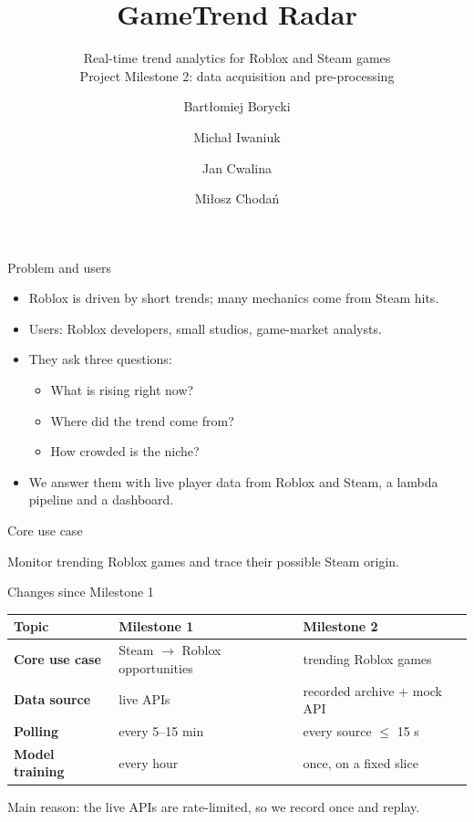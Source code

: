 \documentclass[aspectratio=169,10pt]{beamer}
\title{GameTrend Radar}
\subtitle{Real-time trend analytics for Roblox and Steam games\\Project Milestone 2: data acquisition and pre-processing}
\author[Team KFC]{Bart\l{}omiej Borycki \and Micha\l{} Iwaniuk \and Jan Cwalina \and Mi\l{}osz Choda\'n}
\institute[]{Team KFC}
\date{}
\begin{document}
\begin{frame}
  \titlepage
\end{frame}

\begin{frame}{Problem and users}
  \begin{itemize}
    \item Roblox is driven by short trends; many mechanics come from Steam hits.
    \item Users: Roblox developers, small studios, game-market analysts.
    \item They ask three questions:
    \begin{itemize}
      \item What is rising right now?
      \item Where did the trend come from?
      \item How crowded is the niche?
    \end{itemize}
    \item We answer them with live player data from Roblox and Steam, a lambda pipeline and a dashboard.
  \end{itemize}
\end{frame}

\begin{frame}{Core use case}
  \centering
  \resizebox{0.92\linewidth}{!}{}
  \vspace{2mm}

  \small Monitor trending Roblox games and trace their possible Steam origin.
\end{frame}

\begin{frame}{Changes since Milestone 1}
  \centering
  \begin{tabular}{>{\bfseries}l l l}
    \toprule
    Topic & Milestone 1 & Milestone 2\\
    \midrule
    Core use case & Steam $\rightarrow$ Roblox opportunities & trending Roblox games\\
    Data source & live APIs & recorded archive + mock API\\
    Polling & every 5--15 min & every source $\le$ 15 s\\
    Model training & every hour & once, on a fixed slice\\
    \bottomrule
  \end{tabular}

  \vspace{5mm}
  \small Main reason: the live APIs are rate-limited, so we record once and replay.
\end{frame}
\end{document}
